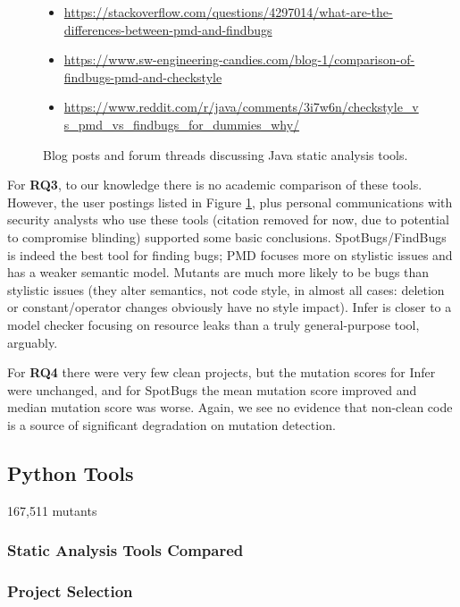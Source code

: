 \begin{figure}
  {\scriptsize
  \begin{itemize}
  \item \url{https://stackoverflow.com/questions/4297014/what-are-the-differences-between-pmd-and-findbugs}
  \item \url{https://www.sw-engineering-candies.com/blog-1/comparison-of-findbugs-pmd-and-checkstyle}
  \item \url{https://www.reddit.com/r/java/comments/3i7w6n/checkstyle_vs_pmd_vs_findbugs_for_dummies_why/}
  \end{itemize}
  }
\caption{Blog posts and forum threads discussing Java static analysis tools.}
\label{fig:blog}
\end{figure}

For {\bf RQ3}, to our knowledge there is no academic comparison of these tools.  However, the user postings listed in Figure \ref{fig:blog}, plus personal communications with security analysts who use these tools (citation removed for now, due to potential to compromise blinding) supported some basic conclusions.  SpotBugs/FindBugs is indeed the best tool for finding bugs; PMD focuses more on stylistic issues and has a weaker semantic model.  Mutants are much more likely to be bugs than stylistic issues (they alter semantics, not code style, in almost all cases: deletion or constant/operator changes obviously have no style impact).  Infer is closer to a model checker focusing on resource leaks than a truly general-purpose tool, arguably.

For {\bf RQ4} there were very few clean projects, but the mutation scores for Infer were unchanged, and for SpotBugs the mean mutation score improved and median mutation score was worse.  Again, we see no evidence that non-clean code is a source of significant degradation on mutation detection.


\subsection{Python Tools}

167,511 mutants

\subsubsection{Static Analysis Tools Compared}

\subsubsection{Project Selection}

